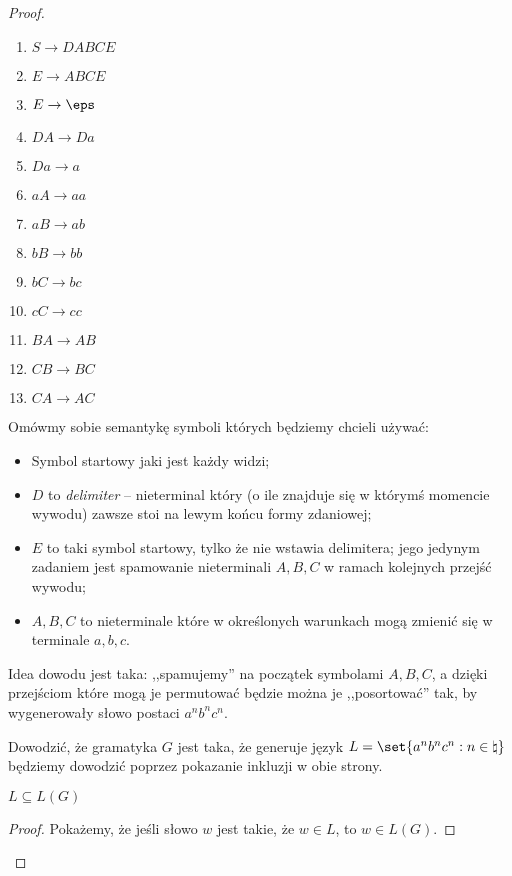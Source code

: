 \begin{proof}
    \begin{enumerate}
        \item \( S \rightarrow DABCE \)
        \item \( E \rightarrow ABCE \) 
        \item \( E \rightarrow \eps \) 
        \item \( DA \rightarrow Da \)
        \item \(Da \rightarrow a\) 
        \item \( aA \rightarrow aa \)
        \item \(aB  \rightarrow ab\)
        \item \(bB \rightarrow bb\) \item \(bC \rightarrow bc\) \item \(cC \rightarrow cc\)
        \item \( BA \rightarrow AB \)
        \item \( CB \rightarrow BC \) 
        \item \(CA \rightarrow AC\)
    \end{enumerate}

    Omówmy sobie semantykę symboli których będziemy chcieli używać:
    
    \begin{itemize}
        \item Symbol startowy jaki jest każdy widzi;
        \item \(D\) to \textit{delimiter} -- nieterminal który (o ile znajduje się w którymś momencie wywodu) zawsze stoi na lewym końcu formy zdaniowej;
        \item \(E\) to taki symbol startowy, tylko że nie wstawia delimitera; jego jedynym zadaniem jest spamowanie nieterminali \(A, B, C\) w ramach kolejnych przejść wywodu;
        \item \(A, B, C\) to nieterminale które w określonych warunkach mogą zmienić się w terminale \(a, b, c\). 
    \end{itemize}
    
    Idea dowodu jest taka: ,,spamujemy'' na początek symbolami \(A, B, C\), a dzięki przejściom które mogą je permutować będzie można je ,,posortować'' tak, by wygenerowały słowo postaci \(a^nb^nc^n\). 
    
    Dowodzić, że gramatyka \(G\) jest taka, że generuje język \(L = \set{a^nb^nc^n : n \in \natural}\) będziemy dowodzić poprzez pokazanie inkluzji w obie strony.
    
    
    \begin{lemma}
        \(L \subseteq L(G)\)
    \end{lemma}
    \begin{proof}
        Pokażemy, że jeśli słowo \(w\) jest takie, że \(w \in L\), to \(w \in L(G)\). 
        

\end{proof}
\end{proof}
